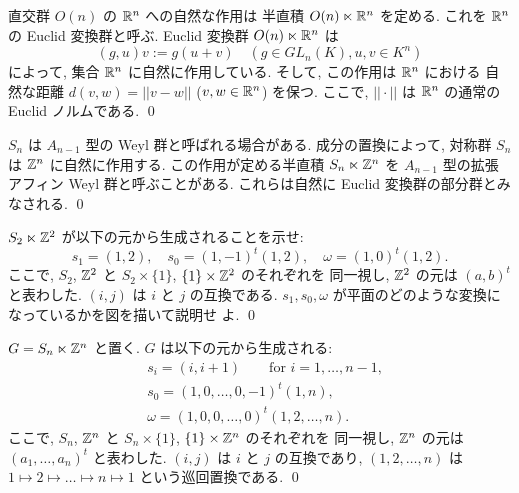 \documentclass[12pt,twoside]{jarticle}
\def\Z{{\Bbb Z}} %
\def\R{{\Bbb R}} %
\begin{document}
\begin{question}
  直交群 $O(n)$ の $\R^n$ への自然な作用は
  半直積 $O(n)\ltimes\R^n$ を定める.
  これを $\R^n$ の Euclid 変換群と呼ぶ.
  Euclid 変換群 $O(n)\ltimes\R^n$ は
  \begin{equation*}
    (g, u) v := g(u + v)
    \quad (g\in GL_n(K), u,v\in K^n)
  \end{equation*}
  によって, 集合 $\R^n$ に自然に作用している.
  そして, この作用は $\R^n$ における
  自然な距離 $d(v,w) = ||v-w||$ ($v,w\in\R^n$) を保つ. 
  ここで, $||\cdot||$ は $\R^n$ の通常の Euclid ノルムである.
  \qed
\end{question}

\begin{question}
  $S_n$ は $A_{n-1}$ 型の Weyl 群と呼ばれる場合がある.
  成分の置換によって, 対称群 $S_n$ は $\Z^n$ に自然に作用する.
  この作用が定める半直積 $S_n\ltimes\Z^n$ を $A_{n-1}$ 型の拡張アフィン Weyl 
  群と呼ぶことがある. 
  これらは自然に Euclid 変換群の部分群とみなされる.
  \qed
\end{question}

\begin{question}
  $S_2\ltimes\Z^2$ が以下の元から生成されることを示せ:
  \begin{equation*}
    s_1 = (1,2), \quad
    s_0 = (1,-1)^t(1,2), \quad
    \omega = (1,0)^t (1,2).
  \end{equation*}
  ここで, $S_2$, $\Z^2$ と $S_2\times\{1\}$, $\{1\}\times\Z^2$ のそれぞれを
  同一視し, $\Z^2$ の元は $(a,b)^t$ と表わした.
  $(i,j)$ は $i$ と $j$ の互換である.
  $s_1, s_0, \omega$ が平面のどのような変換になっているかを図を描いて説明せ
  よ. \qed
\end{question}

\begin{question}
  $G = S_n\ltimes\Z^n$ と置く. $G$ は以下の元から生成される:
  \begin{align*}
    &
    s_i = (i,i+1) \qquad \text{for $i=1,\dots,n-1$},
    \\ &
    s_0 = (1,0,\dots,0,-1)^t(1,n),
    \\ &
    \omega = (1,0,0,\dots,0)^t (1,2,\dots,n).
  \end{align*}
  ここで, $S_n$, $\Z^n$ と $S_n\times\{1\}$, $\{1\}\times\Z^n$ のそれぞれを
  同一視し, $\Z^n$ の元は $(a_1,\dots,a_n)^t$ と表わした. 
  $(i,j)$ は $i$ と $j$ の互換であり, $(1,2,\dots,n)$ は %
  $1 \mapsto 2 \mapsto \dots \mapsto n \mapsto 1$ という巡回置換である. \qed
\end{question}
\end{document}
